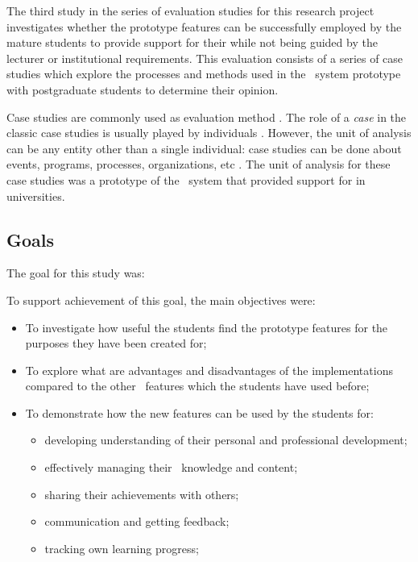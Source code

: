 The third study in the series of evaluation studies for this research project
investigates whether the prototype features can be successfully employed by the
mature students to provide support for their \LLLs while not being guided by the
lecturer or institutional requirements. This evaluation consists of a series of
case studies which explore the processes and methods used in the \ep~system
prototype with postgraduate students to determine their opinion.

Case studies are commonly used as evaluation method \citep{Yin2012}. The role of
a \textit{case} in the classic case studies is usually played by individuals
\citep{Yin2009}. However, the unit of analysis can be any entity other than a
single individual: case studies can be done about events, programs, processes,
organizations, etc \citep{Yin2009,Patton2002}. The unit of analysis for these
case studies was a prototype of the \ep~system that provided support for \LLLs
in universities.

\subsection{Goals}

The goal for this study was:


To support achievement of this goal, the main objectives were:

\begin{itemize}
  \item To investigate how useful the students find the prototype features for
  the purposes they have been created for;
  \item To explore what are advantages and disadvantages of the implementations
  compared to the other \ep~features which the students have used before;
  \item To demonstrate how the new features can be used by the students for:
  \begin{itemize}
    \item developing understanding of their personal and professional 
    development;
    \item effectively managing their \ep~knowledge and content;
    \item sharing their achievements with others;
    \item communication and getting feedback;
    \item tracking own learning progress; 
  \end{itemize}
\end{itemize}

